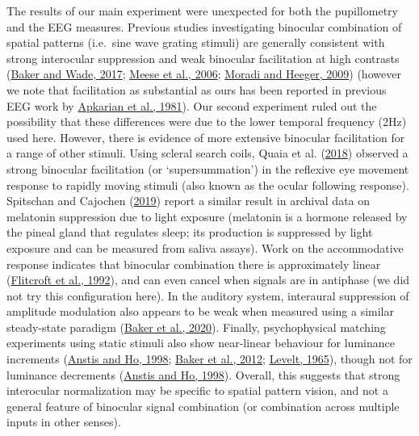 \documentclass[
]{article}
\begin{document}
The results of our main experiment were unexpected for both the pupillometry and the EEG measures. Previous studies investigating binocular combination of spatial patterns (i.e.~sine wave grating stimuli) are generally consistent with strong interocular suppression and weak binocular facilitation at high contrasts (\protect\hyperlink{ref-Baker2017}{Baker and Wade, 2017}; \protect\hyperlink{ref-Meese2006}{Meese et al., 2006}; \protect\hyperlink{ref-Moradi2009}{Moradi and Heeger, 2009}) (however we note that facilitation as substantial as ours has been reported in previous EEG work by \protect\hyperlink{ref-Apkarian1981}{Apkarian et al., 1981}). Our second experiment ruled out the possibility that these differences were due to the lower temporal frequency (2Hz) used here. However, there is evidence of more extensive binocular facilitation for a range of other stimuli. Using scleral search coils, Quaia et al. (\protect\hyperlink{ref-Quaia2018}{2018}) observed a strong binocular facilitation (or `supersummation') in the reflexive eye movement response to rapidly moving stimuli (also known as the ocular following response). Spitschan and Cajochen (\protect\hyperlink{ref-Spitschan2019}{2019}) report a similar result in archival data on melatonin suppression due to light exposure (melatonin is a hormone released by the pineal gland that regulates sleep; its production is suppressed by light exposure and can be measured from saliva assays). Work on the accommodative response indicates that binocular combination there is approximately linear (\protect\hyperlink{ref-Flitcroft1992}{Flitcroft et al., 1992}), and can even cancel when signals are in antiphase (we did not try this configuration here). In the auditory system, interaural suppression of amplitude modulation also appears to be weak when measured using a similar steady-state paradigm (\protect\hyperlink{ref-Baker2020}{Baker et al., 2020}). Finally, psychophysical matching experiments using static stimuli also show near-linear behaviour for luminance increments (\protect\hyperlink{ref-Anstis1998}{Anstis and Ho, 1998}; \protect\hyperlink{ref-Baker2012}{Baker et al., 2012}; \protect\hyperlink{ref-Levelt1965}{Levelt, 1965}), though not for luminance decrements (\protect\hyperlink{ref-Anstis1998}{Anstis and Ho, 1998}). Overall, this suggests that strong interocular normalization may be specific to spatial pattern vision, and not a general feature of binocular signal combination (or combination across multiple inputs in other senses).
\end{document}
